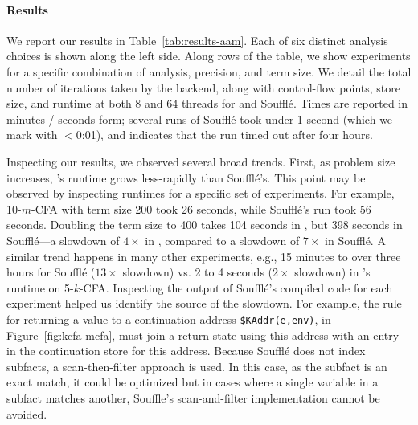 \paragraph*{Results}

We report our results in Table~\ref{tab:results-aam}. Each of six
distinct analysis choices is shown along the left side. Along rows of
the table, we show experiments for a specific combination of analysis,
precision, and term size. We detail the total number of iterations
taken by the \slog{} backend, along with control-flow points, store
size, and runtime at both $8$ and $64$ threads for \slog{} and
Souffl\'e. Times are reported in minutes / seconds form; several runs
of Souffl\'e took under 1 second (which we mark with $<$0:01), and
\timeout{} indicates that the run timed out after four hours.

Inspecting our results, we observed several broad trends. First, as
problem size increases, \slog{}'s runtime grows less-rapidly than
Souffl\'e's.
%
This point may be observed by inspecting runtimes for a specific
set of experiments. For example, 10-$m$-CFA with term size 200 took
\slog{} 26 seconds, while Souffl\'e's run took 56 seconds. Doubling
the term size to 400 takes 104 seconds in \slog{}, but 398 seconds in
Souffl\'e---a slowdown of $4\times$ in \slog{}, compared to a slowdown
of $7\times$ in Souffl\'e. A similar trend happens in many other
experiments, e.g., 15 minutes to over three hours for Souffl\'e
($13\times$ slowdown) vs. 2 to 4 seconds ($2\times$ slowdown) in
\slog{}'s runtime on 5-$k$-CFA. Inspecting the output of Souffl\'e's
compiled \CC{} code for each experiment helped us identify the source
of the slowdown. For example, the rule for returning a value to a continuation address \texttt{\$KAddr(e,env)}, in Figure~\ref{fig:kcfa-mcfa}, must
join a return state using this address with an entry in the continuation store for this address. Because Souffl\'e does not index subfacts, a scan-then-filter approach is used. In this case, as the subfact is an exact match, it could be optimized but in cases where a single variable in a subfact matches another, Souffle's scan-and-filter implementation cannot be avoided.

